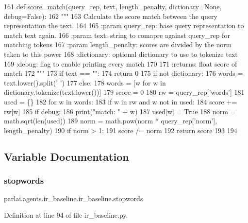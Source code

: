 \begin{DoxyCode}
161 \textcolor{keyword}{def }\hyperlink{namespaceparlai_1_1agents_1_1ir__baseline_1_1ir__baseline_a64aaaccb38f5dd5f51c09439456b2f6e}{score\_match}(query\_rep, text, length\_penalty, dictionary=None, debug=False):
162     \textcolor{stringliteral}{"""}
163 \textcolor{stringliteral}{    Calculate the score match between the query representation the text.}
164 \textcolor{stringliteral}{}
165 \textcolor{stringliteral}{    :param query\_rep: base query representation to match text again.}
166 \textcolor{stringliteral}{    :param text: string to comapre against query\_rep for matching tokens}
167 \textcolor{stringliteral}{    :param length\_penalty: scores are divided by the norm taken to this power}
168 \textcolor{stringliteral}{    :dictionary: optional dictionary to use to tokenize text}
169 \textcolor{stringliteral}{    :debug: flag to enable printing every match}
170 \textcolor{stringliteral}{}
171 \textcolor{stringliteral}{    :returns: float score of match}
172 \textcolor{stringliteral}{    """}
173     \textcolor{keywordflow}{if} text == \textcolor{stringliteral}{""}:
174         \textcolor{keywordflow}{return} 0
175     \textcolor{keywordflow}{if} \textcolor{keywordflow}{not} dictionary:
176         words = text.lower().split(\textcolor{stringliteral}{' '})
177     \textcolor{keywordflow}{else}:
178         words = [w \textcolor{keywordflow}{for} w \textcolor{keywordflow}{in} dictionary.tokenize(text.lower())]
179     score = 0
180     rw = query\_rep[\textcolor{stringliteral}{'words'}]
181     used = \{\}
182     \textcolor{keywordflow}{for} w \textcolor{keywordflow}{in} words:
183         \textcolor{keywordflow}{if} w \textcolor{keywordflow}{in} rw \textcolor{keywordflow}{and} w \textcolor{keywordflow}{not} \textcolor{keywordflow}{in} used:
184             score += rw[w]
185             \textcolor{keywordflow}{if} debug:
186                 print(\textcolor{stringliteral}{"match: "} + w)
187         used[w] = \textcolor{keyword}{True}
188     norm = math.sqrt(len(used))
189     norm = math.pow(norm * query\_rep[\textcolor{stringliteral}{'norm'}], length\_penalty)
190     \textcolor{keywordflow}{if} norm > 1:
191         score /= norm
192     \textcolor{keywordflow}{return} score
193 
194 
\end{DoxyCode}


\subsection{Variable Documentation}
\mbox{\label{namespaceparlai_1_1agents_1_1ir__baseline_1_1ir__baseline_a7e7907f0dfbd5f6c59bd56187a1b44df}} 
\subsubsection{\texorpdfstring{stopwords}{stopwords}}
{\footnotesize\ttfamily parlai.\+agents.\+ir\+\_\+baseline.\+ir\+\_\+baseline.\+stopwords}



Definition at line 94 of file ir\+\_\+baseline.\+py.

